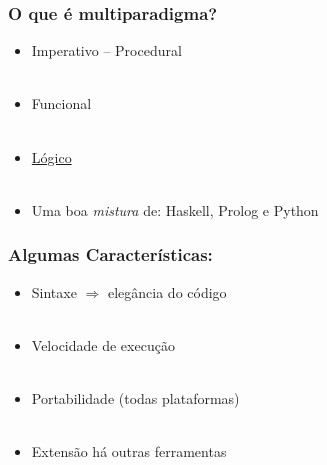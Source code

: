 \documentclass[brazil]{beamer}
\begin{document}
\begin{frame}
    \frametitle{O que é multiparadigma?}

    \begin{itemize}
      \item Imperativo -- Procedural \\~\\
      \item Funcional \\~\\
      \item \underline{Lógico} \\~\\
      \item Uma boa \textit{mistura} de: Haskell, Prolog e Python

    \end{itemize}

\end{frame}
\begin{frame}
    \frametitle{Algumas Características:}

    \begin{itemize}
    
      \item Sintaxe $\Rightarrow $ elegância do código \\~\\
      \item Velocidade de execução \\~\\
      \item Portabilidade (todas plataformas) \\~\\
      \item Extensão há outras ferramentas
      
    \end{itemize}
\end{frame}
\end{document}
